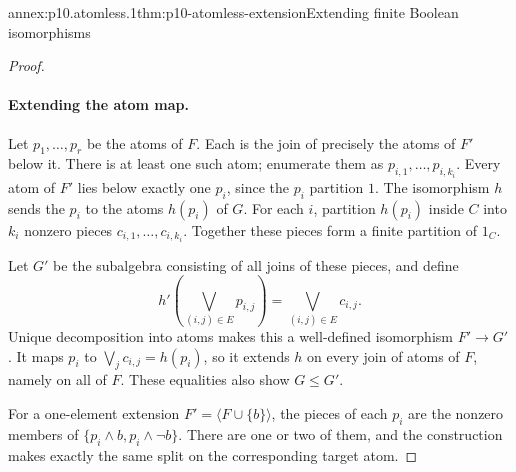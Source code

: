 \begin{annexitem}{annex:p10.atomless.1}{thm:p10-atomless-extension}{Extending finite Boolean isomorphisms}
\begin{proof}
\paragraph{Extending the atom map.}
Let \(p_1,\ldots,p_r\) be the atoms of \(F\).
Each is the join of precisely the atoms of \(F'\) below it.
There is at least one such atom; enumerate them as
\(p_{i,1},\ldots,p_{i,k_i}\).
Every atom of \(F'\) lies below exactly one \(p_i\), since
the \(p_i\) partition \(1\).
The isomorphism \(h\) sends the \(p_i\) to the atoms \(h(p_i)\)
of \(G\).
For each \(i\), partition \(h(p_i)\) inside \(C\) into
\(k_i\) nonzero pieces \(c_{i,1},\ldots,c_{i,k_i}\).
Together these pieces form a finite partition of \(1_C\).

Let \(G'\) be the subalgebra consisting of all joins of these pieces,
and define
\[
 h'\left(\bigvee_{(i,j)\in E}p_{i,j}\right)
       =\bigvee_{(i,j)\in E}c_{i,j}.
\]
Unique decomposition into atoms makes this a well-defined
isomorphism \(F'\to G'\).
It maps \(p_i\) to \(\bigvee_jc_{i,j}=h(p_i)\), so it extends
\(h\) on every join of atoms of \(F\), namely on all of \(F\).
These equalities also show \(G\leq G'\).

For a one-element extension
\(F'=\langle F\cup\{b\}\rangle\), the pieces of each \(p_i\)
are the nonzero members of
\(\{p_i\wedge b,p_i\wedge\neg b\}\).
There are one or two of them, and the construction makes
exactly the same split on the corresponding target atom.
\end{proof}
\end{annexitem}

